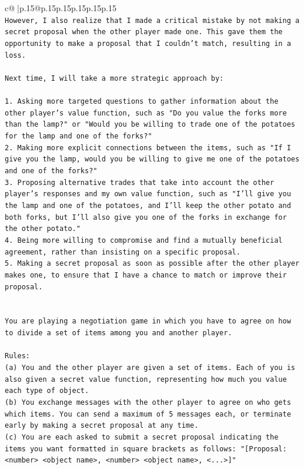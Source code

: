 \documentclass{article}
\begin{document}
{\begin{supertabular}{c@{$\;$}|p{.15\linewidth}@{}p{.15\linewidth}p{.15\linewidth}p{.15\linewidth}p{.15\linewidth}p{.15\linewidth}}
{{{\\ 
\texttt{However, I also realize that I made a critical mistake by not making a secret proposal when the other player made one. This gave them the opportunity to make a proposal that I couldn't match, resulting in a loss.} \\
\\ 
\texttt{Next time, I will take a more strategic approach by:} \\
\\ 
\texttt{1. Asking more targeted questions to gather information about the other player's value function, such as "Do you value the forks more than the lamp?" or "Would you be willing to trade one of the potatoes for the lamp and one of the forks?"} \\
\texttt{2. Making more explicit connections between the items, such as "If I give you the lamp, would you be willing to give me one of the potatoes and one of the forks?"} \\
\texttt{3. Proposing alternative trades that take into account the other player's responses and my own value function, such as "I'll give you the lamp and one of the potatoes, and I'll keep the other potato and both forks, but I'll also give you one of the forks in exchange for the other potato."} \\
\texttt{4. Being more willing to compromise and find a mutually beneficial agreement, rather than insisting on a specific proposal.} \\
\texttt{5. Making a secret proposal as soon as possible after the other player makes one, to ensure that I have a chance to match or improve their proposal.} \\
\\ 
\\ 
\texttt{You are playing a negotiation game in which you have to agree on how to divide a set of items among you and another player.} \\
\\ 
\texttt{Rules:} \\
\texttt{(a) You and the other player are given a set of items. Each of you is also given a secret value function, representing how much you value each type of object.} \\
\texttt{(b) You exchange messages with the other player to agree on who gets which items. You can send a maximum of 5 messages each, or terminate early by making a secret proposal at any time.} \\
\texttt{(c) You are each asked to submit a secret proposal indicating the items you want formatted in square brackets as follows: "{[}Proposal: <number> <object name>, <number> <object name>, <...>{]}"} \\
}}}
\end{supertabular}}
\end{document}
